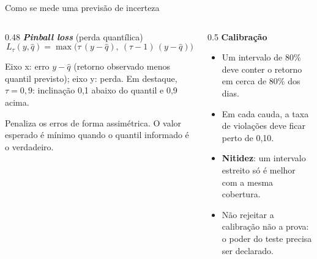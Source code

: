 \documentclass[aspectratio=169,10pt]{beamer}
\begin{document}
\begin{frame}{Como se mede uma previsão de incerteza}
  \begin{columns}[T]
    \begin{column}{0.48\textwidth}
      \textbf{\textit{Pinball loss}} (perda quantílica)
      \[
        L_\tau(y,\hat q) = \max\bigl(\tau\,(y-\hat q),\ (\tau-1)\,(y-\hat q)\bigr)
      \]
      \centering

      \raggedright
      {\footnotesize Eixo x: erro \(y-\hat q\) (retorno observado menos quantil
      previsto); eixo y: perda. Em destaque, \(\tau = 0{,}9\): inclinação 0,1 abaixo
      do quantil e 0,9 acima.\par}
      \par
      \raggedright
      \small Penaliza os erros de forma assimétrica. O valor esperado é mínimo
      quando o quantil informado é o verdadeiro.
    \end{column}
    \begin{column}{0.5\textwidth}
      \textbf{Calibração}
      \begin{itemize}
        \item Um intervalo de 80\% deve conter o retorno em cerca de 80\% dos dias.
        \item Em cada cauda, a taxa de violações deve ficar perto de 0,10.
        \item \textbf{Nitidez}: um intervalo estreito só é melhor com a mesma cobertura.
        \item Não rejeitar a calibração não a prova: o \alert{poder} do teste
          precisa ser declarado.
      \end{itemize}
    \end{column}
  \end{columns}
\end{frame}
\end{document}

